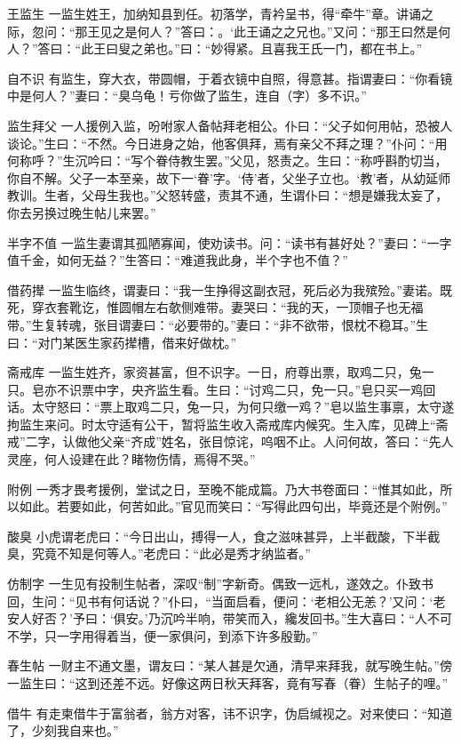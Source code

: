 \documentclass[12pt,UTF8]{ctexbook}
\begin{document}
王监生
一监生姓王，加纳知县到任。初落学，青衿呈书，得“牵牛”章。讲诵之际，忽问：“那王见之是何人？”答曰：。‘此王诵之之兄也。”又问：“那王曰然是何人？”答曰：“此王曰叟之弟也。”曰：“妙得紧。且喜我王氏一门，都在书上。”

自不识
有监生，穿大衣，带圆帽，于着衣镜中自照，得意甚。指谓妻曰：“你看镜中是何人？”妻曰：“臭乌龟！亏你做了监生，连自（字）多不识。”

监生拜父
一人援例入监，吩咐家人备帖拜老相公。仆曰：“父子如何用帖，恐被人谈论。”生曰：“不然。今日进身之始，他客俱拜，焉有亲父不拜之理？”仆问：“用何称呼？”生沉吟曰：“写个眷侍教生罢。”父见，怒责之。生曰：“称呼斟酌切当，你自不解。父子一本至亲，故下一‘眷’字。‘侍’者，父坐子立也。‘教’者，从幼延师教训。生者，父母生我也。”父怒转盛，责其不通，生谓仆曰：“想是嫌我太妄了，你去另换过晚生帖儿来罢。”

半字不值
一监生妻谓其孤陋寡闻，使劝读书。问：“读书有甚好处？”妻曰：“一字值千金，如何无益？”生答曰：“难道我此身，半个字也不值？”

借药撵
一监生临终，谓妻曰：“我一生挣得这副衣冠，死后必为我殡殓。”妻诺。既死，穿衣套靴讫，惟圆帽左右欹侧难带。妻哭曰：“我的天，一顶帽子也无福带。”生复转魂，张目谓妻曰：“必要带的。”妻曰：“非不欲带，恨枕不稳耳。”生曰：“对门某医生家药撵槽，借来好做枕。”

斋戒库
一监生姓齐，家资甚富，但不识字。一日，府尊出票，取鸡二只，兔一只。皂亦不识票中字，央齐监生看。生曰：“讨鸡二只，免一只。”皂只买一鸡回话。太守怒曰：“票上取鸡二只，兔一只，为何只缴一鸡？”皂以监生事禀，太守遂拘监生来问。时太守适有公干，暂将监生收入斋戒库内候究。生入库，见碑上“斋戒”二字，认做他父亲“齐成”姓名，张目惊诧，呜咽不止。人问何故，答曰：“先人灵座，何人设建在此？睹物伤情，焉得不哭。”

附例
一秀才畏考援例，堂试之日，至晚不能成篇。乃大书卷面曰：“惟其如此，所以如此。若要如此，何苦如此。”官见而笑曰：“写得此四句出，毕竟还是个附例。”

酸臭
小虎谓老虎曰：“今日出山，搏得一人，食之滋味甚异，上半截酸，下半截臭，究竟不知是何等人。”老虎曰：“此必是秀才纳监者。”

仿制字
一生见有投制生帖者，深叹“制”字新奇。偶致一远札，遂效之。仆致书回，生问：“见书有何话说？”仆曰，“当面启看，便问：‘老相公无恙？’又问：‘老安人好否？’予曰：‘俱安。’乃沉吟半响，带笑而入，纔发回书。”生大喜曰：“人不可不学，只一字用得着当，便一家俱问，到添下许多殷勤。”

春生帖
一财主不通文墨，谓友曰：“某人甚是欠通，清早来拜我，就写晚生帖。”傍一监生曰：“这到还差不远。好像这两日秋天拜客，竟有写春（眷）生帖子的哩。”

借牛
有走柬借牛于富翁者，翁方对客，讳不识字，伪启缄视之。对来使曰：“知道了，少刻我自来也。”
\end{document}
